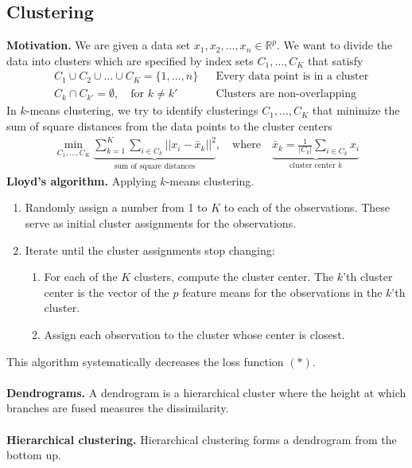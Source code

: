 \documentclass[12pt, letterpaper]{article}
\begin{document}
\subsection{Clustering}
\textbf{Motivation.} We are given a data set $x_1, x_2, \dots, x_n \in \mathbb{R}^p$. We
want to divide the data into clusters which are specified by index sets $C_1,\dots,C_K$ 
that satisfy
\begin{align*}
    & C_1 \cup C_2 \cup \dots \cup C_K = \{1,\dots, n\} & &\text{Every data point is in a cluster} \\
    & C_k \cap C_{k'} = \emptyset,\quad \text{for } k \ne k' & &\text{Clusters are non-overlapping}
\end{align*}
In $k$-means clustering, we try to identify clusterings $C_1,\dots, C_K$ that minimize the sum of square 
distances from the data points to the cluster centers
\begin{align*}
    \min_{C_1,\dots,C_K}\underbrace{\sum_{k=1}^{K}\sum_{i\in C_k} ||x_i - \bar x_k ||^2}_{\text{sum of square distances}}, \quad \text{where} \quad \underbrace{\bar x_k = \frac{1}{|C_k|}\sum_{i\in C_k} x_i}_{\text{cluster center }k} \tag{$\ast$}
\end{align*}
\textbf{Lloyd's algorithm.} Applying $k$-means clustering.
\begin{enumerate}
    \item Randomly assign a number from 1 to $K$ to each of the observations. These serve as initial 
    cluster assignments for the observations.
    \item Iterate until the cluster assignments stop changing:
    \begin{enumerate}
        \item For each of the $K$ clusters, compute the cluster center. The $k$'th cluster center is 
        the vector of the $p$ feature means for the observations in the $k$'th cluster.
        \item Assign each observation to the cluster whose center is closest.
    \end{enumerate}
\end{enumerate}
This algorithm systematically decreases the loss function $(\ast)$. \\ \\
\textbf{Dendrograms.} A dendrogram is a hierarchical cluster where the height at which branches
are fused measures the dissimilarity. \\ \\
\textbf{Hierarchical clustering.} Hierarchical clustering forms a dendrogram from the bottom up.
\end{document}
